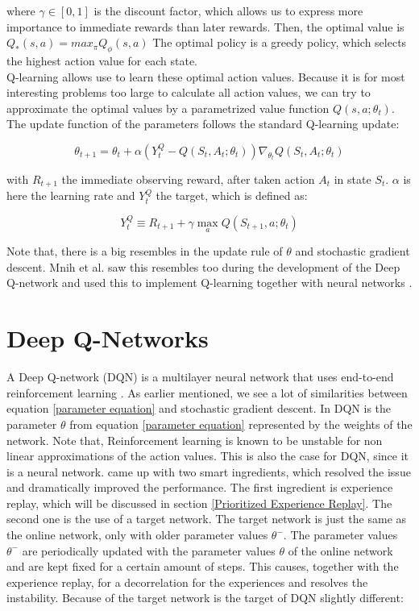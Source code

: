 \documentclass{sig-alternate}
\begin{document}
 where $\gamma\in[0,1]$ is the discount factor, which allows us to express more importance to immediate rewards than later rewards. Then, the optimal value is $Q_{*}(s,a) = max_{\pi}Q_{\phi}(s,a) $ The optimal policy is a greedy policy, which selects the highest action value for each state.\\
Q-learning \cite{watkins1992q} allows use to learn these optimal action values. Because it is for most interesting problems too large to calculate all action values, we can try to approximate the optimal values by a parametrized value function $Q(s,a;\theta_{t})$. The update function of the parameters follows the standard Q-learning update:

\begin{equation}
\label{parameter equation}
\theta_{t+1}= \theta_{t} + \alpha(Y_{t}^Q - Q(S_{t},A_{t};\theta_{t}))\nabla_{\theta_{t}}Q(S_{t},A_{t};\theta_t)
\end{equation}

with $R_{t+1}$ the immediate observing reward, after taken action $A_{t}$ in state $S_{t}$. $\alpha$ is here the learning rate and $Y_{t}^Q$ the target, which is defined as:

\begin{equation}
Y_{t}^Q \equiv R_{t+1} + \gamma \max_{a}Q(S_{t+1},a;\theta_{t})
\end{equation}


Note that, there is a big resembles in the update rule of $\theta$ and stochastic gradient descent. Mnih et al. saw this resembles too during the development of the Deep Q-network and used this to implement Q-learning together with neural networks \cite{mnih2015human}.

\section{Deep Q-Networks}\label{Original DQN}

A Deep Q-network (DQN) is a multilayer neural network that uses end-to-end reinforcement learning \cite{mnih2015human}. As earlier mentioned, we see a lot of similarities between equation \ref{parameter equation} and stochastic gradient descent. In DQN is the parameter $\theta$ from equation \ref{parameter equation} represented by the weights of the network. Note that, Reinforcement learning is known to be unstable for non linear approximations of the action values. This is also the case for DQN, since it is a neural network. \cite{mnih2015human} came up with two smart ingredients, which resolved the issue and dramatically improved the performance. The first ingredient is experience replay, which will be discussed in section \ref{Prioritized Experience Replay}. The second one is the use of a target network. The target network is just the same as the online network, only with older parameter values $\theta^{-}$. The parameter values $\theta^{-}$ are periodically updated with the parameter values $\theta$ of the online network and are kept fixed for a certain amount of steps. This causes, together with the experience replay, for a decorrelation for the experiences and resolves the instability. Because of the target network is the target of DQN slightly different:
 
\end{document}
